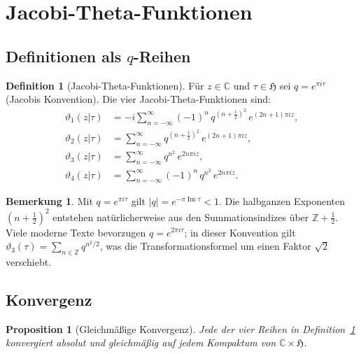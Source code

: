 \documentclass[12pt,a4paper]{amsart}
\newtheorem{proposition}[theorem]{Proposition}
\theoremstyle{definition}
\newtheorem{definition}[theorem]{Definition}
\newtheorem{remark}[theorem]{Bemerkung}
\begin{document}
\section{Jacobi-Theta-Funktionen}\label{sec:jacobi}

\subsection{Definitionen als $q$-Reihen}

\begin{definition}[Jacobi-Theta-Funktionen]\label{def:jacobi}
Für $z \in \mathbb{C}$ und $\tau \in \mathfrak{H}$ sei $q = e^{\pi i \tau}$
(Jacobis Konvention). Die vier Jacobi-Theta-Funktionen sind:
\begin{align}
  \vartheta_1(z|\tau) &= -i \sum_{n=-\infty}^{\infty}
    (-1)^n\, q^{(n+\tfrac{1}{2})^2}\, e^{(2n+1)\pi iz},
    \label{eq:theta1}\\
  \vartheta_2(z|\tau) &= \sum_{n=-\infty}^{\infty}
    q^{(n+\tfrac{1}{2})^2}\, e^{(2n+1)\pi iz},
    \label{eq:theta2}\\
  \vartheta_3(z|\tau) &= \sum_{n=-\infty}^{\infty}
    q^{n^2}\, e^{2n\pi iz},
    \label{eq:theta3}\\
  \vartheta_4(z|\tau) &= \sum_{n=-\infty}^{\infty}
    (-1)^n\, q^{n^2}\, e^{2n\pi iz}.
    \label{eq:theta4}
\end{align}
\end{definition}

\begin{remark}
Mit $q = e^{\pi i\tau}$ gilt $|q| = e^{-\pi\operatorname{Im}\tau} < 1$.
Die halbganzen Exponenten $(n+\frac12)^2$ entstehen natürlicherweise aus
den Summationsindizes über $\mathbb{Z}+\frac12$.
Viele moderne Texte bevorzugen $q = e^{2\pi i\tau}$; in dieser Konvention
gilt $\vartheta_3(\tau) = \sum_{n\in\mathbb{Z}} q^{n^2/2}$,
was die Transformationsformel um einen Faktor $\sqrt{2}$ verschiebt.
\end{remark}

\subsection{Konvergenz}

\begin{proposition}[Gleichmäßige Konvergenz]\label{prop:convergence}
Jede der vier Reihen in Definition~\ref{def:jacobi} konvergiert absolut und
gleichmäßig auf jedem Kompaktum von $\mathbb{C} \times \mathfrak{H}$.
\end{proposition}
\end{document}
